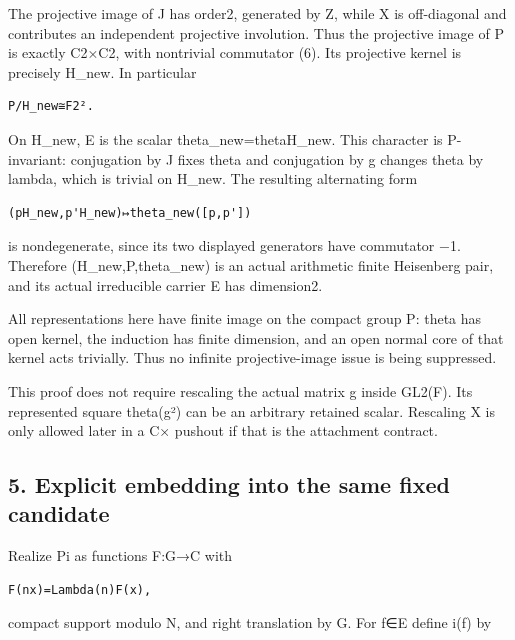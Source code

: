 The projective image of J has order2, generated by Z, while X is
off-diagonal and contributes an independent projective involution. Thus
the projective image of P is exactly C2×C2, with nontrivial commutator
(6). Its projective kernel is precisely H\_new. In particular

\begin{Verbatim}[fontsize=\small,breaklines=true,breakanywhere=true]
P/H_new≅F2².
\end{Verbatim}

On H\_new, E is the scalar theta\_new=theta\textbar H\_new. This
character is P-invariant: conjugation by J fixes theta and conjugation
by g changes theta by lambda, which is trivial on H\_new. The resulting
alternating form

\begin{Verbatim}[fontsize=\small,breaklines=true,breakanywhere=true]
(pH_new,p'H_new)↦theta_new([p,p'])
\end{Verbatim}

is nondegenerate, since its two displayed generators have commutator −1.
Therefore (H\_new,P,theta\_new) is an actual arithmetic finite
Heisenberg pair, and its actual irreducible carrier E has dimension2.

All representations here have finite image on the compact group P: theta
has open kernel, the induction has finite dimension, and an open normal
core of that kernel acts trivially. Thus no infinite projective-image
issue is being suppressed.

This proof does not require rescaling the actual matrix g inside GL2(F).
Its represented square theta(g²) can be an arbitrary retained scalar.
Rescaling X is only allowed later in a C× pushout if that is the
attachment contract.

\hypertarget{rank2-explicit-embedding-into-the-same-fixed-candidate}{%
\subsection{5. Explicit embedding into the same fixed
candidate}\label{rank2-explicit-embedding-into-the-same-fixed-candidate}}

Realize Pi as functions F:G→C with

\begin{Verbatim}[fontsize=\small,breaklines=true,breakanywhere=true]
F(nx)=Lambda(n)F(x),
\end{Verbatim}

compact support modulo N, and right translation by G. For f∈E define
i(f) by

